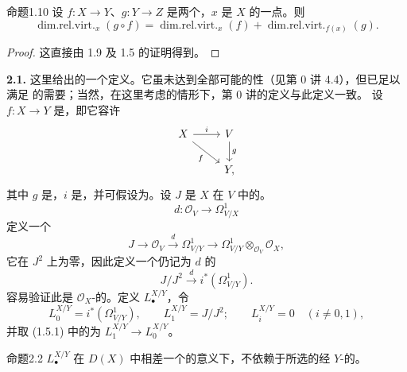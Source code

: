 \begin{SGAresult}{命题}{1.10}
设 $f:X\to Y$、$g:Y\to Z$ 是两个，$x$ 是 $X$ 的一点。则
\[\operatorname{dim.rel.virt.}_x(g\circ f)=\operatorname{dim.rel.virt.}_x(f)+\operatorname{dim.rel.virt.}_{f(x)}(g).\]
\end{SGAresult}
\begin{proof}这直接由 1.9 及 1.5 的证明得到。\end{proof}
\textbf{2.1.} 这里给出的一个定义。它虽未达到全部可能的性（见第 0 讲 4.4），但已足以满足 的需要；当然，在这里考虑的情形下，第 0 讲的定义与此定义一致。
设 $f:X\to Y$ 是，即它容许
\[
\begin{tikzcd}X\arrow[r,"i"]\arrow[dr,"f"']&V\arrow[d,"g"]\\&Y,\end{tikzcd}
\]
其中 $g$ 是，$i$ 是，并可假设为。设 $J$ 是 $X$ 在 $V$ 中的。
\[d:\mathscr O_V\longrightarrow\Omega^1_{V/X}\]
定义一个
\[J\longrightarrow\mathscr O_V\xrightarrow{d}\Omega^1_{V/Y}\longrightarrow\Omega^1_{V/Y}\otimes_{\mathscr O_V}\mathscr O_X,\]
它在 $J^2$ 上为零，因此定义一个仍记为 $d$ 的
\[J/J^2\xrightarrow{d}i^*(\Omega^1_{V/Y}).\tag{2.1.1}\]
容易验证此是 $\mathscr O_X$-的。定义 $L^{X/Y}_\bullet$，令
\[L^{X/Y}_0=i^*(\Omega^1_{V/Y}),\qquad L^{X/Y}_1=J/J^2;\qquad L^{X/Y}_i=0\quad(i\ne0,1),\]
并取 (1.5.1) 中的为 $L^{X/Y}_1\to L^{X/Y}_0$。
\begin{SGAresult}{命题}{2.2}
 $L^{X/Y}_\bullet$ 在 $D(X)$ 中相差一个的意义下，不依赖于所选的经 $Y$-的。
\end{SGAresult}
